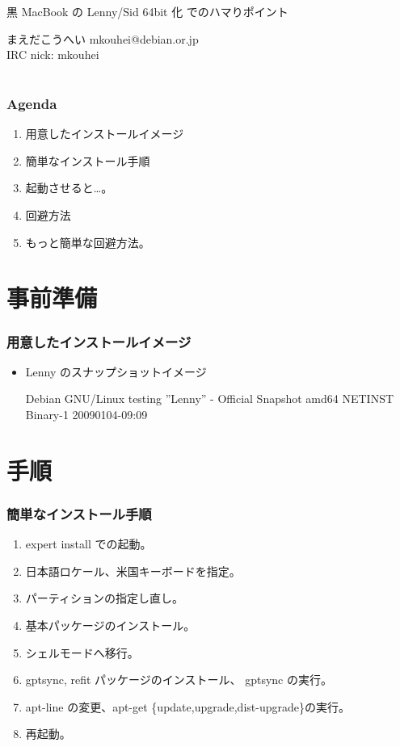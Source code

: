 
\begin{frame}{}

 \begin{center}

 黒 MacBook の Lenny/Sid 64bit 化 でのハマりポイント

 まえだこうへい mkouhei@debian.or.jp\\IRC nick: mkouhei
\end{center}


\end{frame}

\section{}
\begin{frame}
 \frametitle{Agenda}
  \begin{enumerate}
  \item 用意したインストールイメージ
  \item 簡単なインストール手順
  \item 起動させると…。
  \item 回避方法
  \item もっと簡単な回避方法。
 \end{enumerate}
\end{frame}

\section{事前準備}

\begin{frame}
 \frametitle{用意したインストールイメージ}
  \begin{itemize}
  \item Lenny のスナップショットイメージ

Debian GNU/Linux testing ''Lenny'' - Official Snapshot amd64
	 NETINST Binary-1 20090104-09:09

 \end{itemize}
\end{frame}

\section{手順}
\begin{frame}
 \frametitle{簡単なインストール手順}
 \begin{enumerate}
  \item expert install での起動。
  \item 日本語ロケール、米国キーボードを指定。
  \item パーティションの指定し直し。
  \item 基本パッケージのインストール。
  \item シェルモードへ移行。
  \item gptsync, refit パッケージのインストール、 gptsync の実行。
  \item apt-line の変更、apt-get \{update,upgrade,dist-upgrade\}の実行。
  \item 再起動。
 \end{enumerate}
\end{frame}

